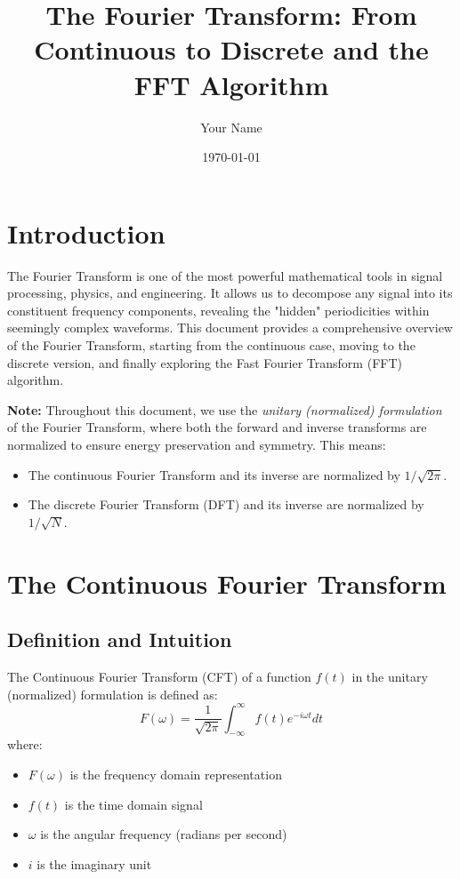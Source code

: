 \documentclass[11pt,a4paper]{article}
\title{The Fourier Transform: From Continuous to Discrete and the FFT Algorithm}
\author{Your Name}
\date{\today}
\begin{document}
\maketitle

\tableofcontents
\newpage

\section{Introduction}
The Fourier Transform is one of the most powerful mathematical tools in signal processing, physics, and engineering. It allows us to decompose any signal into its constituent frequency components, revealing the "hidden" periodicities within seemingly complex waveforms. This document provides a comprehensive overview of the Fourier Transform, starting from the continuous case, moving to the discrete version, and finally exploring the Fast Fourier Transform (FFT) algorithm.

	\textbf{Note:} Throughout this document, we use the \emph{unitary (normalized) formulation} of the Fourier Transform, where both the forward and inverse transforms are normalized to ensure energy preservation and symmetry. This means:
\begin{itemize}
    \item The continuous Fourier Transform and its inverse are normalized by $1/\sqrt{2\pi}$.
    \item The discrete Fourier Transform (DFT) and its inverse are normalized by $1/\sqrt{N}$.
\end{itemize}


\section{The Continuous Fourier Transform}

\subsection{Definition and Intuition}

The Continuous Fourier Transform (CFT) of a function $f(t)$ in the unitary (normalized) formulation is defined as:
\begin{equation}
F(\omega) = \frac{1}{\sqrt{2\pi}} \int_{-\infty}^{\infty} f(t) e^{-i\omega t} dt
\end{equation}
where:
\begin{itemize}
    \item $F(\omega)$ is the frequency domain representation
    \item $f(t)$ is the time domain signal
    \item $\omega$ is the angular frequency (radians per second)
    \item $i$ is the imaginary unit
\end{itemize}
\end{document}
